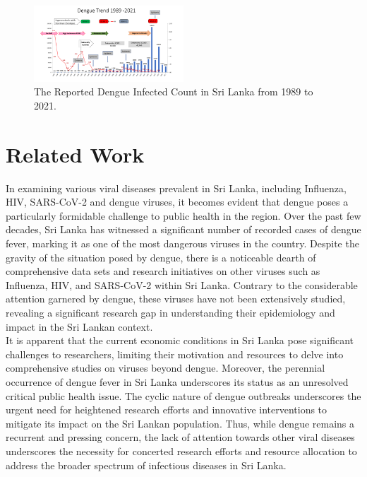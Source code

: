 \documentclass[conference]{IEEEtran}
\begin{document}
\begin{figure}[htbp]
    \centering
    \includegraphics[width=0.5\textwidth]{fig3.png}
    \caption{The Reported Dengue Infected Count in Sri Lanka from 1989 to 2021.}
\end{figure}


\section{Related Work}

In examining various viral diseases prevalent in Sri Lanka, including Influenza,
HIV, SARS-CoV-2 and dengue viruses, it becomes evident that dengue poses a
particularly formidable challenge to public health in the region. Over the
past few decades, Sri Lanka has witnessed a significant number of recorded
cases of dengue fever, marking it as one of the most dangerous viruses in
the country. Despite the gravity of the situation posed by dengue, there is a
noticeable dearth of comprehensive data sets and research initiatives on other
viruses such as Influenza, HIV, and SARS-CoV-2 within Sri Lanka. Contrary to the
considerable attention garnered by dengue, these viruses have not been extensively
studied, revealing a significant research gap in understanding their epidemiology
and impact in the Sri Lankan context. \\

It is apparent that the current economic
conditions in Sri Lanka pose significant challenges to researchers, limiting their
motivation and resources to delve into comprehensive studies on viruses beyond dengue.
Moreover, the perennial occurrence of dengue fever in Sri Lanka underscores its
status as an unresolved critical public health issue. The cyclic nature of dengue
outbreaks underscores the urgent need for heightened research efforts and innovative
interventions to mitigate its impact on the Sri Lankan population. Thus, while dengue
remains a recurrent and pressing concern, the lack of attention towards other viral
diseases underscores the necessity for concerted research efforts and resource
allocation to address the broader spectrum of infectious diseases in Sri Lanka. \\
\end{document}

